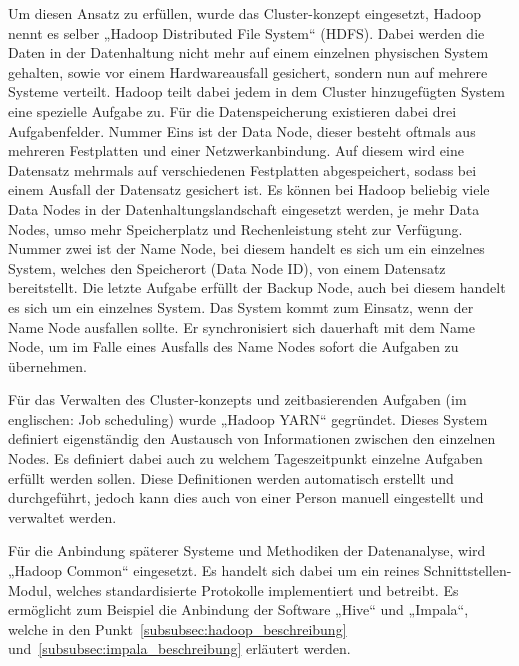 Um diesen Ansatz zu erfüllen, wurde das Cluster-konzept eingesetzt, Hadoop nennt
es selber „Hadoop Distributed File System“ (HDFS).  Dabei werden die Daten in
der Datenhaltung nicht mehr auf einem einzelnen physischen System gehalten,
sowie vor einem Hardwareausfall gesichert, sondern nun auf mehrere Systeme
verteilt. Hadoop teilt dabei jedem in dem Cluster hinzugefügten System eine
spezielle Aufgabe zu. Für die Datenspeicherung existieren dabei drei
Aufgabenfelder. Nummer Eins ist der Data Node, dieser besteht oftmals aus
mehreren Festplatten und einer Netzwerkanbindung. Auf diesem wird eine
Datensatz mehrmals auf verschiedenen Festplatten abgespeichert, sodass bei
einem Ausfall der Datensatz gesichert ist. Es können bei Hadoop beliebig viele
Data Nodes in der Datenhaltungslandschaft eingesetzt werden, je mehr Data
Nodes, umso mehr Speicherplatz und Rechenleistung steht zur Verfügung. Nummer
zwei ist der Name Node, bei diesem handelt es sich um ein einzelnes System,
welches den Speicherort (Data Node ID), von einem Datensatz bereitstellt. Die
letzte Aufgabe erfüllt der Backup Node, auch bei diesem handelt es sich um ein
einzelnes System. Das System kommt zum Einsatz, wenn der Name Node ausfallen
sollte. Er synchronisiert sich dauerhaft mit dem Name Node, um im Falle eines
Ausfalls des Name Nodes sofort die Aufgaben zu übernehmen.

Für das Verwalten des Cluster-konzepts und zeitbasierenden Aufgaben (im
englischen: Job scheduling) wurde „Hadoop YARN“ gegründet. Dieses System
definiert eigenständig den Austausch von Informationen zwischen den einzelnen
Nodes. Es definiert dabei auch zu welchem Tageszeitpunkt einzelne Aufgaben
erfüllt werden sollen. Diese Definitionen werden automatisch erstellt und
durchgeführt, jedoch kann dies auch von einer Person manuell eingestellt und
verwaltet werden.

Für die Anbindung späterer Systeme und Methodiken der Datenanalyse, wird
„Hadoop Common“ eingesetzt. Es handelt sich dabei um ein reines
Schnittstellen-Modul, welches standardisierte Protokolle implementiert und
betreibt. Es ermöglicht zum Beispiel die Anbindung der Software „Hive“ und
„Impala“, welche in den Punkt~\ref{subsubsec:hadoop_beschreibung}
und~\ref{subsubsec:impala_beschreibung} erläutert werden.

